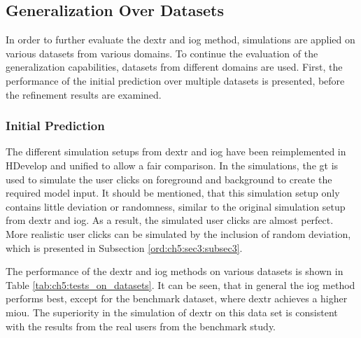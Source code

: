 \subsection{Generalization Over Datasets} \label{ord:ch5:sec2:subsec2}

In order to further evaluate the \gls{dextr} and \gls{iog} method, simulations are applied on various datasets from various domains.
To continue the evaluation of the generalization capabilities, datasets from different domains are used.
First, the performance of the initial prediction over multiple datasets is presented, before the refinement results are examined. 

\subsubsection{Initial Prediction}

The different simulation setups from \gls{dextr} \cite{Man18-DEXTR} and \gls{iog} \cite{Zha20-IOG} have been reimplemented in HDevelop and unified to allow a fair comparison. 
In the simulations, the \gls{gt} is used to simulate the user clicks on foreground and background to create the required model input.
It should be mentioned, that this simulation setup only contains little deviation or randomness, similar to the original simulation setup from \gls{dextr} and \gls{iog}.
As a result, the simulated user clicks are almost perfect.
More realistic user clicks can be simulated by the inclusion of random deviation, which is presented in Subsection \ref{ord:ch5:sec3:subsec3}.

The performance of the \gls{dextr} and \gls{iog} methods on various datasets is shown in Table \ref{tab:ch5:tests_on_datasets}.
It can be seen, that in general the \gls{iog} method performs best, except for the benchmark dataset, where \gls{dextr} achieves a higher \gls{miou}.
The superiority in the simulation of \gls{dextr} on this data set is consistent with the results from the real users from the benchmark study.


